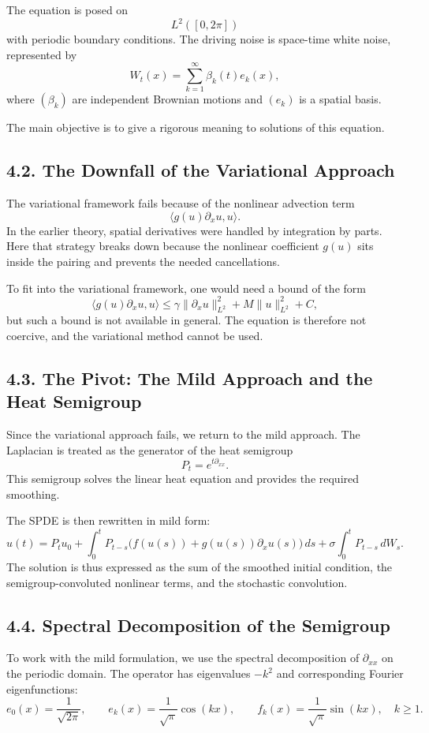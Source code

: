 \documentclass[11pt]{article}
\theoremstyle{definition}
\theoremstyle{remark}
\begin{document}
The equation is posed on
\[
L^2([0,2\pi])
\]
with periodic boundary conditions. The driving noise is space-time white noise, represented by
\[
W_t(x)=\sum_{k=1}^\infty \beta_k(t)e_k(x),
\]
where \((\beta_k)\) are independent Brownian motions and \((e_k)\) is a spatial basis.

The main objective is to give a rigorous meaning to solutions of this equation.

\subsection*{4.2. The Downfall of the Variational Approach}
The variational framework fails because of the nonlinear advection term
\[
\langle g(u)\partial_x u,u\rangle.
\]
In the earlier theory, spatial derivatives were handled by integration by parts. Here that strategy breaks down because the nonlinear coefficient \(g(u)\) sits inside the pairing and prevents the needed cancellations.

To fit into the variational framework, one would need a bound of the form
\[
\langle g(u)\partial_x u,u\rangle
\le
\gamma\|\partial_x u\|_{L^2}^2+M\|u\|_{L^2}^2+C,
\]
but such a bound is not available in general. The equation is therefore not coercive, and the variational method cannot be used.

\subsection*{4.3. The Pivot: The Mild Approach and the Heat Semigroup}
Since the variational approach fails, we return to the mild approach. The Laplacian is treated as the generator of the heat semigroup
\[
P_t=e^{t\partial_{xx}}.
\]
This semigroup solves the linear heat equation and provides the required smoothing.

The SPDE is then rewritten in mild form:
\[
u(t)=P_tu_0
+
\int_0^t P_{t-s}\bigl(f(u(s))+g(u(s))\partial_x u(s)\bigr)\,ds
+
\sigma\int_0^t P_{t-s}\,dW_s.
\]
The solution is thus expressed as the sum of the smoothed initial condition, the semigroup-convoluted nonlinear terms, and the stochastic convolution.

\subsection*{4.4. Spectral Decomposition of the Semigroup}
To work with the mild formulation, we use the spectral decomposition of \(\partial_{xx}\) on the periodic domain. The operator has eigenvalues \(-k^2\) and corresponding Fourier eigenfunctions:
\[
e_0(x)=\frac{1}{\sqrt{2\pi}},
\qquad
e_k(x)=\frac{1}{\sqrt{\pi}}\cos(kx),
\qquad
f_k(x)=\frac{1}{\sqrt{\pi}}\sin(kx),
\quad k\ge 1.
\]
\end{document}
